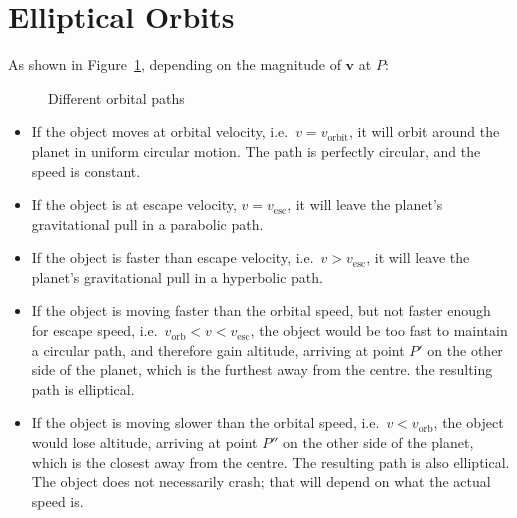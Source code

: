 \section{Elliptical Orbits}
As shown in Figure~\ref{fig:circular-elliptical-parabolic-hyperbolic},
depending on the magnitude of $\bm v$ at $P$:
\begin{figure}[ht]
  \centering
  \caption{Different orbital paths}
  \label{fig:circular-elliptical-parabolic-hyperbolic}
\end{figure}
\begin{itemize}[itemsep=6pt]
\item{\color{magenta}If the object moves at orbital velocity, i.e.\
  $v=v_\text{orbit}$, it will orbit around the planet in uniform circular
  motion. The path is perfectly circular, and the speed is constant.}
  
\item{\color{violet}If the object is at escape velocity, $v=v_\text{esc}$, it
  will leave the planet's gravitational pull in a parabolic path.}
  
\item{\color{green!80!black}If the object is faster than escape velocity, i.e.\
    $v>v_\text{esc}$, it will leave the planet's gravitational pull in a
  hyperbolic path.}
  
\item{\color{orange} If the object is moving faster than the orbital speed, but
  not faster enough for escape speed, i.e.\ $v_\text{orb}<v<v_\text{esc}$, the
  object would be too fast to maintain a circular path, and therefore gain
  altitude, arriving at point $P'$ on the other side of the planet, which is
  the furthest away from the centre. the resulting path is elliptical.}
  
\item{\color{blue} If the object is moving slower than the orbital speed, i.e.\
  $v<v_\text{orb}$, the object would lose altitude, arriving at point $P''$ on
  the other side of the planet, which is the closest away from the centre. The
  resulting path is also elliptical. The object does not necessarily crash; that
  will depend on what the actual speed is.}
\end{itemize}




